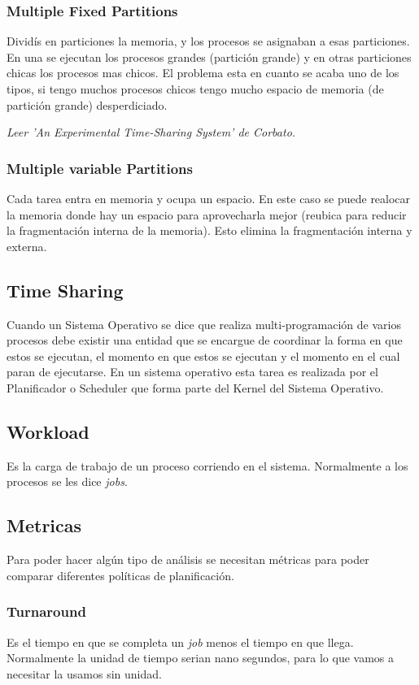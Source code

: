 \documentclass[titlepage,a4paper]{article}
\begin{document}
\subsubsection*{Multiple Fixed Partitions}
Dividís en particiones la memoria, y los procesos se asignaban a esas particiones. En una se ejecutan los procesos grandes (partición grande) y en otras particiones chicas los procesos mas chicos. El problema esta en cuanto se acaba uno de los tipos, si tengo muchos procesos chicos tengo mucho espacio de memoria (de partición grande) desperdiciado.

\textit{Leer 'An Experimental Time-Sharing System' de Corbato.}

\subsubsection*{Multiple variable Partitions}
Cada tarea entra en memoria y ocupa un espacio. En este caso se puede realocar la memoria donde hay un espacio para aprovecharla mejor (reubica para reducir la fragmentación interna de la memoria). Esto elimina la fragmentación interna y externa.


\subsection*{Time Sharing}

Cuando un Sistema Operativo se dice que realiza multi-programación de varios procesos debe existir una entidad que se encargue de coordinar la forma en que estos se ejecutan, el momento en que estos se ejecutan y el momento en el cual paran de ejecutarse. En un sistema operativo esta tarea es realizada por el Planificador o Scheduler que forma parte del Kernel del Sistema Operativo.

\subsection*{Workload}
Es la carga de trabajo de un proceso corriendo en el sistema. Normalmente a los procesos se les dice \emph{jobs}.


\subsection*{Metricas}
Para poder hacer algún tipo de análisis se necesitan métricas para poder comparar diferentes políticas de planificación.

\subsubsection*{Turnaround}
Es el tiempo en que se completa un \emph{job} menos el tiempo en que llega. Normalmente la unidad de tiempo serian nano segundos, para lo que vamos a necesitar la usamos sin unidad.
\end{document}
